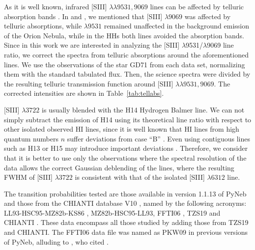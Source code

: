 \documentclass[fleqn,usenatbib]{mnras}
\begin{document}
As it is well known, infrared [S\thinspace III] $\lambda \lambda 9531, 9069$ lines can be affected by telluric absorption bands \citep{Noll12}. In \citet{mendez2021} and \citet{mendez2021-2}, we mentioned that [S\thinspace III] $\lambda 9069$ was affected by telluric absorptions, while $\lambda 9531$ remained unaffected in the background emission of the Orion Nebula, while in the HHs both lines avoided the absorption bands. Since in this work we are interested in analyzing the [S\thinspace III] $\lambda$9531/$\lambda$9069 line ratio, we correct the spectra from telluric absorptions around the aforementioned lines. We use the observations of the star GD71 from each data set, normalizing them with the standard tabulated flux. Then, the science spectra were divided by the resulting telluric transmission function around [S\thinspace III] $\lambda \lambda 9531, 9069$. The corrected intensities are shown in Table~\ref{tab:tellabs}. 

[S\thinspace III] $\lambda 3722$ is usually blended with the H14 Hydrogen Balmer line. We can not simply subtract the emission of H14 using its theoretical line ratio with respect to other isolated observed H\thinspace I lines, since it is well known that H\thinspace I lines from high quantum numbers $n$ suffer deviations from case ``B'' \citep[][]{mesadelgado09, rodriguez20}. Even using  contiguous lines such as H13 or H15 may introduce important deviations \citep[see fig.~A2 of][]{rodriguez20}. Therefore, we consider that it is better to use only the observations where the spectral resolution of the data allows the correct Gaussian deblending of the lines, where the resulting FWHM of [S\thinspace III] $\lambda 3722$ is consistent with that of the isolated [S\thinspace III] $\lambda 6312$ line.

The transition probabilities tested are those available in version 1.1.13 of PyNeb and those from the CHIANTI database V10 \citep[][]{Chianti10}, named by the following acronyms: LL93-HSC95-MZ82b-KS86 \citep[][]{LL93,HSC95,MZ82b, KS86}, MZ82b-HSC95-LL93\citep[][]{MZ82b,HSC95,LL93}, FFTI06 \citep[][]{FFTI06}, TZS19\citep[][]{TZS19} and CHIANTI \citep[][]{Tayal97,FFTI06, Hudson12}. These data encompass all those studied by \citet{Juan-de-Dios17} adding  those from TZS19 and CHIANTI. The FFTI06 data file  was named as PKW09 in previous versions of PyNeb, alluding to \citet{Podobedova09}, who cited \citet{FFTI06}. 
\end{document}
